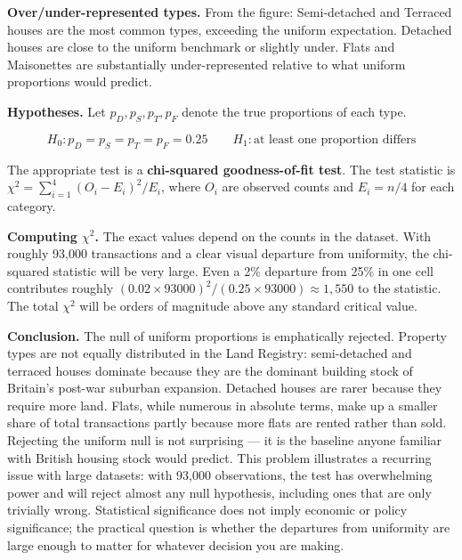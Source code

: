 \documentclass[
  letterpaper,
  11pt,
  twoside,
  openany]{scrbook}
\begin{document}
\begin{tcolorbox}[enhanced jigsaw, arc=.35mm, bottomrule=.15mm, bottomtitle=1mm, breakable, colback=white, colbacktitle=quarto-callout-note-color!10!white, colframe=quarto-callout-note-color-frame, coltitle=black, left=2mm, leftrule=.75mm, opacityback=0, opacitybacktitle=0.6, rightrule=.15mm, title=\textcolor{quarto-callout-note-color}{\faInfo}\hspace{0.5em}{Solution to Problem 11}, titlerule=0mm, toprule=.15mm, toptitle=1mm]

\textbf{Over/under-represented types.} From the figure: Semi-detached
and Terraced houses are the most common types, exceeding the uniform
expectation. Detached houses are close to the uniform benchmark or
slightly under. Flats and Maisonettes are substantially
under-represented relative to what uniform proportions would predict.

\textbf{Hypotheses.} Let \(p_D, p_S, p_T, p_F\) denote the true
proportions of each type.

\[H_0: p_D = p_S = p_T = p_F = 0.25 \qquad H_1: \text{at least one proportion differs}\]

The appropriate test is a \textbf{chi-squared goodness-of-fit test}. The
test statistic is \(\chi^2 = \sum_{i=1}^{4} (O_i - E_i)^2 / E_i\), where
\(O_i\) are observed counts and \(E_i = n/4\) for each category.

\textbf{Computing \(\chi^2\).} The exact values depend on the counts in
the dataset. With roughly 93,000 transactions and a clear visual
departure from uniformity, the chi-squared statistic will be very large.
Even a 2\% departure from 25\% in one cell contributes roughly
\((0.02 \times 93000)^2 / (0.25 \times 93000) \approx 1{,}550\) to the
statistic. The total \(\chi^2\) will be orders of magnitude above any
standard critical value.

\textbf{Conclusion.} The null of uniform proportions is emphatically
rejected. Property types are not equally distributed in the Land
Registry: semi-detached and terraced houses dominate because they are
the dominant building stock of Britain's post-war suburban expansion.
Detached houses are rarer because they require more land. Flats, while
numerous in absolute terms, make up a smaller share of total
transactions partly because more flats are rented rather than sold.
Rejecting the uniform null is not surprising --- it is the baseline
anyone familiar with British housing stock would predict. This problem
illustrates a recurring issue with large datasets: with 93,000
observations, the test has overwhelming power and will reject almost any
null hypothesis, including ones that are only trivially wrong.
Statistical significance does not imply economic or policy significance;
the practical question is whether the departures from uniformity are
large enough to matter for whatever decision you are making.

\end{tcolorbox}
\end{document}
